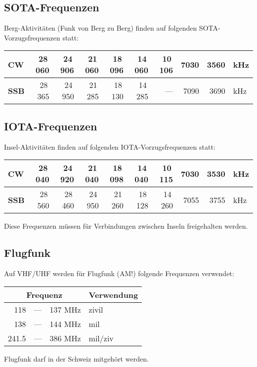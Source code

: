 \subsection{SOTA-Frequenzen}
Berg-Aktivitäten (Funk von Berg zu Berg) finden auf folgenden SOTA-Vorzugsfrequenzen statt:

\vspace{1em}
\begin{tabular}{lrrrrrrrrl}
 \bfseries CW & 28 060 & 24 906 & 21 060 & 18 096 & 14 060 & 10 106 & 7030 & 3560 & kHz \\ \toprule
\bfseries SSB & 28 365 & 24 950 & 21 285 & 18 130 & 14 285 & — & 7090 & 3690 & kHz
\end{tabular}


\subsection{IOTA-Frequenzen}
Insel-Aktivitäten finden auf folgenden IOTA-Vorzugsfrequenzen statt:

\vspace{1em}
\begin{tabular}{lrrrrrrrrl}
\bfseries CW & 28 040 & 24 920 & 21 040 & 18 098 & 14 040 & 10 115 & 7030 & 3530 & kHz \\ \toprule
\bfseries SSB & 28 560 & 28 460 & 24 950 & 21 260 & 18 128 & 14 260 & 7055 & 3755 & kHz
\end{tabular}
\vspace{1em}

Diese Frequenzen müssen für Verbindungen zwischen Inseln freigehalten werden.

\subsection{Flugfunk}
Auf VHF/UHF werden für Flugfunk (AM!) folgende Frequenzen verwendet:

\vspace{1em}
\begin{tabular}{rcll}
\multicolumn{3}{c}{\textbf{Frequenz}} & \textbf{Verwendung} \\ \toprule \arrayrulecolor{rowsep}
118 & — & 137 MHz & zivil \\ \midrule
138 & — & 144 MHz & mil \\ \midrule
241.5 & — & 386 MHz & mil/ziv \\ \midrule
\end{tabular}
\vspace{1em}

Flugfunk darf in der Schweiz mitgehört werden.






